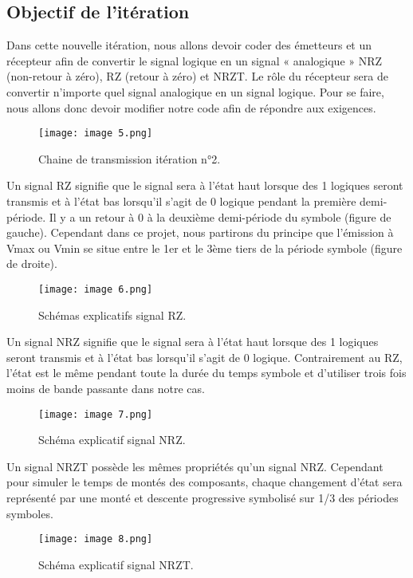 \subsection{Objectif de l'itération}

Dans cette nouvelle itération, nous allons devoir coder des émetteurs et un récepteur afin de convertir le signal logique en un signal « analogique » NRZ (non-retour à zéro), RZ (retour à zéro) et NRZT. Le rôle du récepteur sera de convertir n’importe quel signal analogique en un signal logique. Pour se faire, nous allons donc devoir modifier notre code afin de répondre aux exigences.

\begin{figure}[h]
    \centering
    \texttt{[image: image 5.png]}
    \caption{\label{fig:image5}Chaine de transmission itération n°2.}
\end{figure}

Un signal RZ signifie que le signal sera à l’état haut lorsque des 1 logiques seront transmis et à l’état bas lorsqu’il s’agit de 0 logique pendant la première demi-période. Il y a un retour à 0 à la deuxième demi-période du symbole (figure de gauche). Cependant dans ce projet, nous partirons du principe que l’émission à Vmax ou Vmin se situe entre le 1er et le 3ème tiers de la période symbole (figure de droite).

\begin{figure}[h]
    \centering
    \texttt{[image: image 6.png]}
    \caption{\label{fig:image6}Schémas explicatifs signal RZ.}
\end{figure}

Un signal NRZ signifie que le signal sera à l’état haut lorsque des 1 logiques seront transmis et à l’état bas lorsqu’il s’agit de 0 logique. Contrairement au RZ, l’état est le même pendant toute la durée du temps symbole et d’utiliser trois fois moins de bande passante dans notre cas.

\begin{figure}[h]
    \centering
    \texttt{[image: image 7.png]}
    \caption{\label{fig:image7}Schéma explicatif signal NRZ.}
\end{figure}

Un signal NRZT possède les mêmes propriétés qu’un signal NRZ. Cependant pour simuler le temps de montés des composants, chaque changement d’état sera représenté par une monté et descente progressive symbolisé sur 1/3 des périodes symboles.

\begin{figure}[h]
    \centering
    \texttt{[image: image 8.png]}
    \caption{\label{fig:image8}Schéma explicatif signal NRZT.}
\end{figure}

